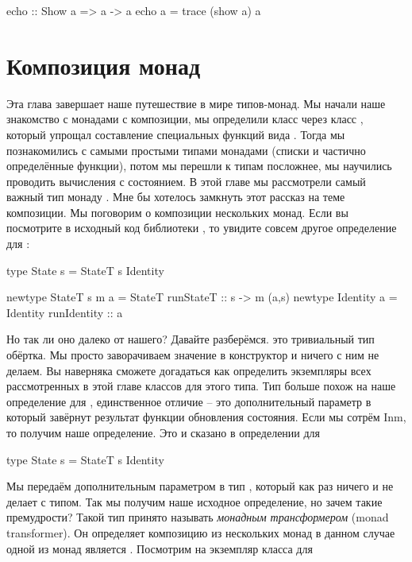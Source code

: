 \begin{code}
echo :: Show a => a -> a
echo a = trace (show a) a
\end{code}



\section{Композиция монад}

Эта глава завершает наше путешествие в мире типов-монад.
Мы начали наше знакомство с монадами с композиции, 
мы определили класс  через класс ,
который упрощал составление специальных функций
вида . Тогда мы познакомились с самыми простыми
типами монадами (списки и частично определённые функции),
потом мы перешли к типам посложнее, мы научились проводить
вычисления с состоянием. В этой главе мы рассмотрели
самый важный тип монаду . Мне бы хотелось замкнуть
этот рассказ на теме композиции. Мы поговорим о композиции
нескольких монад.  
Если вы посмотрите в исходный код библиотеки ,
то увидите совсем другое определение для :

\begin{code}
type State s = StateT s Identity

newtype StateT s m a = StateT { runStateT :: s -> m (a,s) }
newtype Identity a = Identity { runIdentity :: a }
\end{code}

Но так ли оно далеко от нашего? Давайте разберёмся.
 это тривиальный тип обёртка. Мы просто
заворачиваем значение в конструктор и ничего с ним не делаем.
Вы наверняка сможете догадаться как определить экземпляры
всех рассмотренных в этой главе классов для этого типа. 
Тип  больше похож на наше определение для ,
единственное отличие -- это дополнительный параметр  в который
завёрнут результат функции обновления состояния.
Если мы сотрём In{m}, то получим наше определение. 
Это и сказано в определении для 

\begin{code}
type State s = StateT s Identity
\end{code}

Мы передаём дополнительным параметром в  тип ,
который как раз ничего и не делает с типом. Так мы получим
наше исходное определение, но зачем такие премудрости?
Такой тип принято называть \emph{монадным трансформером} (monad transformer). 
Он определяет композицию из нескольких монад в данном случае 
одной из монад является . Посмотрим на экземпляр класса
 для 

